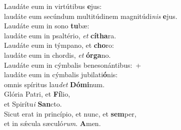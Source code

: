 \evenverse Laudáte eum in virtútibus \textbf{e}jus:~\*\\
\evenverse laudáte eum secúndum multitúdinem magnitúdi\textit{nis} \textbf{e}jus.\\
\oddverse Laudáte eum in sono \textbf{tu}bæ:~\*\\
\oddverse laudáte eum in psaltério, \textit{et} \textbf{cí}\textbf{tha}ra.\\
\evenverse Laudáte eum in týmpano, et \textbf{cho}ro:~\*\\
\evenverse laudáte eum in chordis, \textit{et} \textbf{ór}\textbf{ga}no.\\
\oddverse Laudáte eum in cýmbalis benesonántibus:~+\\
\oddverse  laudáte eum in cýmbalis jubilati\textbf{ó}nis:~\*\\
\oddverse omnis spíritus lau\textit{det} \textbf{Dó}\textbf{mi}num.\\
\evenverse Glória Patri, et \textbf{Fí}lio,~\*\\
\evenverse et Spirítu\textit{i} \textbf{San}cto.\\
\oddverse Sicut erat in princípio, et nunc, et \textbf{sem}per,~\*\\
\oddverse et in sǽcula sæculó\textit{rum}. \textbf{A}men.\\
